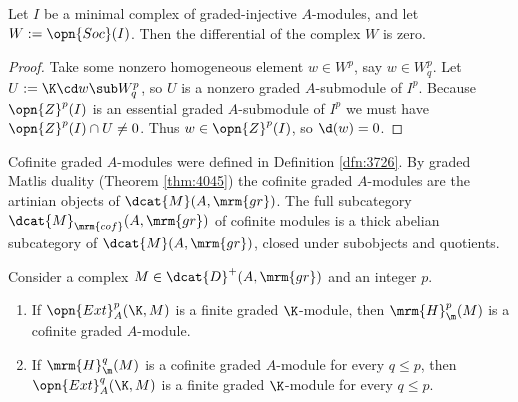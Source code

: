 \begin{lem} \label{lem:3840}
Let $I$ be a minimal complex of graded-injective $A$-modules, and let 
$W := \opn{Soc}(I)$. 
Then the differential of the complex $W$ is zero. 
\end{lem}

\begin{proof}
Take some nonzero homogeneous element $w \in W^p$, say $w \in W^p_q$. 
Let $U := \K \cd w \sub W^p_q$, so $U$ is a nonzero graded 
$A$-submodule of $I^p$. Because $\opn{Z}^p(I)$ is an essential graded 
$A$-submodule of $I^p$ we must have 
$\opn{Z}^p(I) \cap U \neq 0$. Thus $w \in \opn{Z}^p(I)$, so 
$\d(w) = 0$.
\end{proof}

Cofinite graded $A$-modules were defined in Definition \ref{dfn:3726}. 
By graded Matlis duality (Theorem \ref{thm:4045}) the cofinite graded 
$A$-modules are the artinian objects of $\dcat{M}(A, \mrm{gr})$. 
The full subcategory $\dcat{M}_{\mrm{cof}}(A, \mrm{gr})$ of cofinite modules 
is a thick abelian subcategory of $\dcat{M}(A, \mrm{gr})$, closed under 
subobjects and quotients.

\begin{lem} \label{lem:3856}
Consider a complex $M \in \dcat{D}^+(A, \mrm{gr})$ and an integer $p$. 
\begin{enumerate}
\item If $\opn{Ext}^p_A(\K, M)$ is a finite graded $\K$-module, then 
$\mrm{H}^p_{\m}(M)$ is a cofinite graded $A$-module. 

\item If $\mrm{H}^{q}_{\m}(M)$ is a cofinite graded $A$-module for every 
$q \leq p$, then $\opn{Ext}^{q}_A(\K, M)$ is a finite graded $\K$-module
for every $q \leq p$.
\end{enumerate}
\end{lem}

